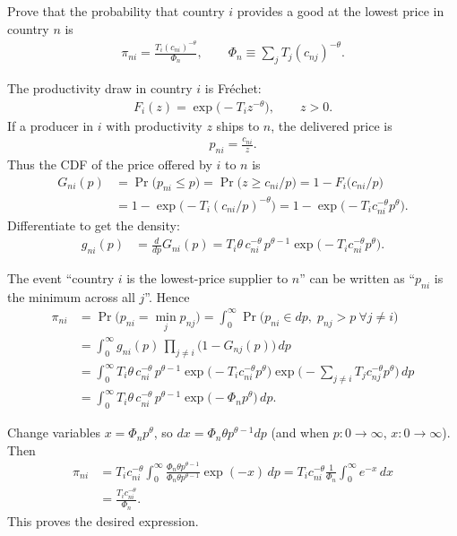 Prove that the probability that country $i$ provides a good at the lowest price in country $n$ is
\begin{align*}
\pi_{ni} = \frac{T_i (c_{ni})^{-\theta}}{\Phi_n},
\qquad
\Phi_n \equiv \sum_j T_j (c_{nj})^{-\theta}.
\end{align*}

\begin{solution}
The productivity draw in country $i$ is Fr\'echet:
\begin{align*}
F_i(z) = \exp\big(-T_i z^{-\theta}\big), \qquad z>0.
\end{align*}
If a producer in $i$ with productivity $z$ ships to $n$, the delivered price is
\begin{align*}
p_{ni}=\frac{c_{ni}}{z}.
\end{align*}
Thus the CDF of the price offered by $i$ to $n$ is
\begin{align*}
G_{ni}(p)
&= \Pr\big(p_{ni}\le p\big)
= \Pr\big(z \ge c_{ni}/p\big)
= 1 - F_i\!\big(c_{ni}/p\big) \\
&= 1 - \exp\!\big(-T_i (c_{ni}/p)^{-\theta}\big)
= 1 - \exp\!\big(-T_i c_{ni}^{-\theta} p^{\theta}\big).
\end{align*}
Differentiate to get the density:
\begin{align*}
g_{ni}(p)
&= \frac{d}{dp}G_{ni}(p)
= T_i \theta\, c_{ni}^{-\theta}\, p^{\theta-1}
    \exp\!\big(-T_i c_{ni}^{-\theta} p^{\theta}\big).
\end{align*}

The event ``country $i$ is the lowest-price supplier to $n$'' can be written as
``$p_{ni}$ is the minimum across all $j$''. Hence
\begin{align*}
\pi_{ni}
&= \Pr\big(p_{ni} = \min_j p_{nj}\big)
= \int_0^\infty \Pr\big(p_{ni}\in dp,\; p_{nj}>p\ \forall j\neq i\big) \\
&= \int_0^\infty g_{ni}(p)\, \prod_{j\neq i}\big(1-G_{nj}(p)\big)\, dp \\
&= \int_0^\infty T_i \theta\, c_{ni}^{-\theta}\, p^{\theta-1}
    \exp\!\big(-T_i c_{ni}^{-\theta} p^{\theta}\big)
    \exp\!\Big(-\sum_{j\neq i} T_j c_{nj}^{-\theta} p^{\theta}\Big)\, dp \\
&= \int_0^\infty T_i \theta\, c_{ni}^{-\theta}\, p^{\theta-1}
    \exp\!\big(-\Phi_n p^{\theta}\big)\, dp.
\end{align*}

Change variables $x=\Phi_n p^{\theta}$, so $dx = \Phi_n \theta p^{\theta-1} dp$ (and when $p:0\to\infty$, $x:0\to\infty$). Then
\begin{align*}
\pi_{ni}
&= T_i c_{ni}^{-\theta} \int_0^\infty \frac{\Phi_n \theta p^{\theta-1}}{\Phi_n \theta p^{\theta-1}}
    \exp(-x)\, dp
= T_i c_{ni}^{-\theta} \frac{1}{\Phi_n}\int_0^\infty e^{-x}\, dx \\
&= \frac{T_i c_{ni}^{-\theta}}{\Phi_n}.
\end{align*}
This proves the desired expression.
\end{solution}
